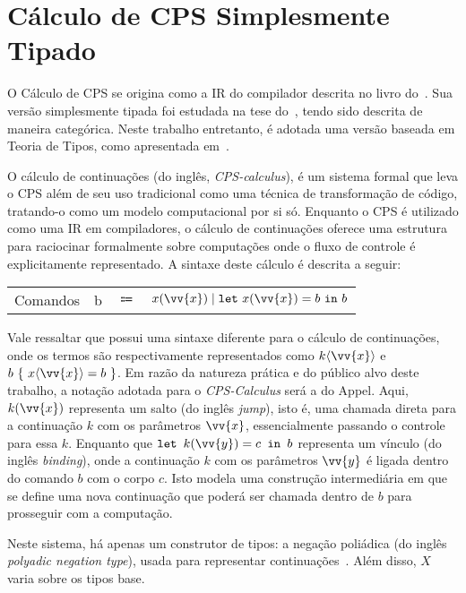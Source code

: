 \section{Cálculo de CPS Simplesmente Tipado}\label{sec:cps-calculus-thielecke}
O Cálculo de CPS se origina como a IR do compilador descrita no livro do~.
Sua versão simplesmente tipada foi estudada na tese do~, tendo sido descrita de maneira categórica.
Neste trabalho entretanto, é adotada uma versão baseada em Teoria de Tipos, como apresentada em~.

O cálculo de continuações (do inglês, \textit{CPS-calculus}), é um sistema formal que leva o CPS além de seu uso tradicional como uma técnica de transformação de código, tratando-o como um modelo computacional por si só.
Enquanto o CPS é utilizado como uma IR em compiladores, o cálculo de continuações oferece uma estrutura para raciocinar formalmente sobre computações onde o fluxo de controle é explicitamente representado.
A sintaxe deste cálculo é descrita a seguir:

\begin{tabular}{lccl}
     Comandos & b & $\Coloneqq$ & $x(\vv{x}) \mid \mathtt{let}\ x(\vv{x}) = b\ \mathtt{in}\ b$ \\
\end{tabular}\label{cps-calculus}

\phantom{Newline}

\noindent
Vale ressaltar que  possui uma sintaxe diferente para o cálculo de continuações, onde os termos são respectivamente representados como $k\langle\vv{x}\rangle$ e $b\ \{\ x\langle \vv{x} \rangle = b\ \}$.
Em razão da natureza prática e do público alvo deste trabalho, a notação adotada para o \textit{CPS-Calculus} será a do Appel.
Aqui, $k(\vv{x})$ representa um salto (do inglês \textit{jump}), isto é, uma chamada direta para a continuação $k$ com os parâmetros $\vv{x}$, essencialmente passando o controle para essa $k$.
Enquanto que $\texttt{let }k(\vv{y}) = c \texttt{ in } b$ representa um vínculo (do inglês \textit{binding}), onde a continuação $k$ com os parâmetros $\vv{y}$ é ligada dentro do comando $b$ com o corpo $c$.
Isto modela uma construção intermediária em que se define uma nova continuação que poderá ser chamada dentro de $b$ para prosseguir com a computação.

Neste sistema, há apenas um construtor de tipos: a negação poliádica (do inglês \textit{polyadic negation type}), usada para representar continuações~\cite{torrens2024operational}.
Além disso, $X$ varia sobre os tipos base.

